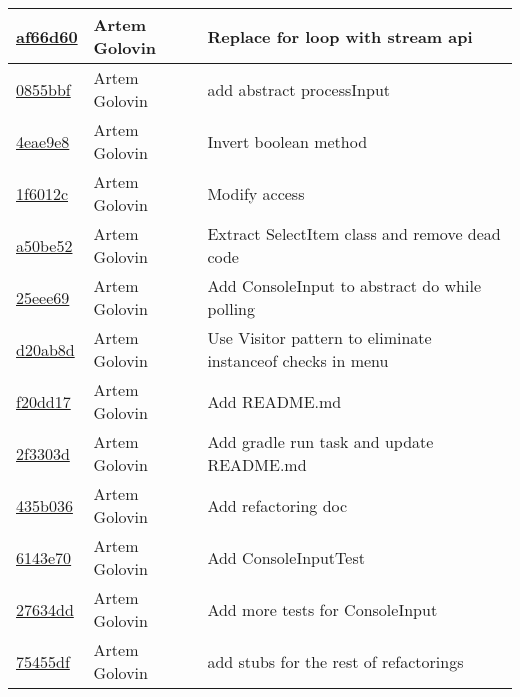\begin{tabularx}{\textwidth}{l l X}
\href{https://github.com/awave1/assessment-loan-system/commit/af66d60295e68510a7d5a597509daabed9a9a6a3}{af66d60} & Artem Golovin & Replace for loop with stream api\\ \hline
\href{https://github.com/awave1/assessment-loan-system/commit/0855bbf763af1780143fc5698bd023aceb0b46d9}{0855bbf} & Artem Golovin & add abstract processInput\\ \hline
\href{https://github.com/awave1/assessment-loan-system/commit/4eae9e8d9aa09cc9d18a701fd9ab9354fb2c567f}{4eae9e8} & Artem Golovin & Invert boolean method\\ \hline
\href{https://github.com/awave1/assessment-loan-system/commit/1f6012cf223f64422902935b22f89e290e3931fd}{1f6012c} & Artem Golovin & Modify access\\ \hline
\href{https://github.com/awave1/assessment-loan-system/commit/a50be52ea770d0b4033bfabd054b7b0f72183d3c}{a50be52} & Artem Golovin & Extract SelectItem class and remove dead code\\ \hline
\href{https://github.com/awave1/assessment-loan-system/commit/25eee6928012caecd2e4cf1285de2094833e84ad}{25eee69} & Artem Golovin & Add ConsoleInput to abstract do{} while polling\\ \hline
\href{https://github.com/awave1/assessment-loan-system/commit/d20ab8d065d243a1339a54cc70d27693d68a7333}{d20ab8d} & Artem Golovin & Use Visitor pattern to eliminate instanceof checks in menu\\ \hline
\href{https://github.com/awave1/assessment-loan-system/commit/f20dd17d79457a325b8c43ad1145364618729e4b}{f20dd17} & Artem Golovin & Add README.md\\ \hline
\href{https://github.com/awave1/assessment-loan-system/commit/2f3303dd8f9a9e26db7d276d1bb89d52bbfbef20}{2f3303d} & Artem Golovin & Add gradle run task and update README.md\\ \hline
\href{https://github.com/awave1/assessment-loan-system/commit/435b036d99e31e858ae1bc044045a16a4b518636}{435b036} & Artem Golovin & Add refactoring doc\\ \hline
\href{https://github.com/awave1/assessment-loan-system/commit/6143e70ec851a43581eb145225377be4dff4fa60}{6143e70} & Artem Golovin & Add ConsoleInputTest\\ \hline
\href{https://github.com/awave1/assessment-loan-system/commit/27634dd874fcfc9cd666da4c28bf96386cb84894}{27634dd} & Artem Golovin & Add more tests for ConsoleInput\\ \hline
\href{https://github.com/awave1/assessment-loan-system/commit/75455df242845e02ef7c6839e84ef77eaa3eca45}{75455df} & Artem Golovin & add stubs for the rest of refactorings\\ \hline

\end{tabularx}

